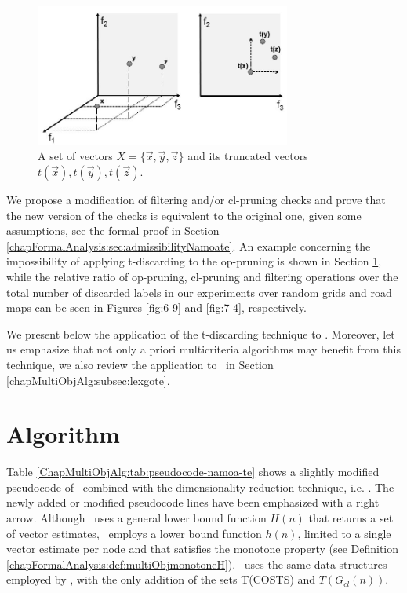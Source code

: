 \begin{figure}%
\centering
\includegraphics[width=0.75\textwidth]{Images/Chapter4/vectors}
\caption{A set of vectors $X = \{\vec x,\vec y,\vec z\}$ and its truncated vectors $t(\vec x),t(\vec y),t(\vec z)$.}
\label{fig:4-1}
\end{figure}

We propose a modification of filtering and/or cl-pruning checks and prove that the new version of the checks is equivalent to the original one, given some assumptions, see the formal proof in Section \ref{chapFormalAnalysis:sec:admissibilityNamoate}. An example concerning the impossibility of applying t-discarding to the op-pruning is shown in Section \ref{chapMultiObjAlg:subsec:namoate}, while the relative ratio of op-pruning, cl-pruning and filtering operations over the total number of discarded labels in our experiments over random grids and road maps can be seen in Figures \ref{fig:6-9} and \ref{fig:7-4}, respectively.

We present below the application of the t-discarding technique to \namoa. 
Moreover, let us emphasize that not only a priori multicriteria algorithms may benefit from this technique, we also review the application to \lexgo \ in Section \ref{chapMultiObjAlg:subsec:lexgote}.

\section{Algorithm \texorpdfstring{\namoate}{NAMOA*te}}
\label{chapMultiObjAlg:subsec:namoate}

Table \ref{ChapMultiObjAlg:tab:pseudocode-namoa-te} shows a slightly modified pseudocode of \namoa \ combined with the dimensionality reduction technique, i.e. \namoate. The newly added or modified pseudocode lines have been emphasized with a right arrow. Although \namoa \ uses a general lower bound function $H(n)$ that returns a set of vector estimates, \namoate \ employs a lower bound function $h(n)$, limited to a single vector estimate per node and that satisfies the monotone property (see Definition \ref{chapFormalAnalysis:def:multiObjmonotoneH}). \namoate \ uses the same data structures employed by \namoa, with the only addition of the sets T(COSTS) and $T(G_{cl}(n))$. 

